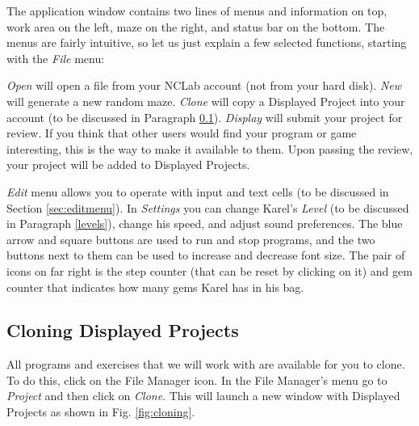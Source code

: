\documentclass[article,A4,12pt]{llncs}
\begin{document}
The application window contains two lines of menus and information on top,
work area on the left, maze on the right, and status bar on the bottom.
The menus are fairly intuitive, so let us just explain a few selected functions, starting 
with the {\em File} menu:

{\em Open} will open a file from your NCLab account (not from your hard disk). {\em New} will generate a new random maze.
{\em Clone} will copy a Displayed Project into your account (to be discussed in Paragraph \ref{cloning}). 
{\em Display} will submit your project for review. If you think that 
      other users would find your program or game interesting, this is the way to make it 
      available to them. Upon passing the review, your project will be added to Displayed Projects.

{\em Edit} menu allows you to operate with input and text cells (to be discussed in 
Section \ref{sec:editmenu}). In {\em Settings} you can change Karel's {\em Level} (to be discussed
in Paragraph \ref{levels}), change his speed, and adjust sound preferences. The blue arrow and square 
buttons are used to run and stop programs, and the two buttons next to them can be used to increase and decrease 
font size. The pair of icons on far right is the step counter (that can be reset by clicking on it) and 
gem counter that indicates how many gems Karel has in his bag.

\subsection{Cloning Displayed Projects} \label{cloning}

All programs and exercises that we will work with are
available for you to clone. To do this, 
click on the File Manager icon. In the File Manager's menu go to 
{\em Project} and then click on {\em Clone}. This will launch a new window 
with Displayed Projects as shown in Fig. \ref{fig:cloning}.
\end{document}
